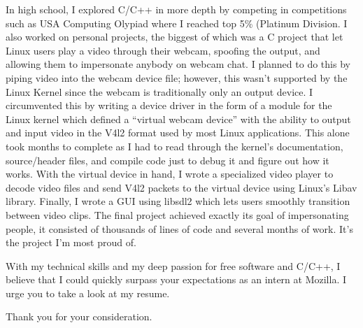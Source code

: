 \documentclass[11pt, letterpaper]{awesome-cv}
\begin{document}
\begin{cvletter}
In high school, I explored C/C++ in more depth by competing in competitions such as USA Computing Olypiad where I reached top 5\% (Platinum Division. I also worked on personal projects, the biggest of which was a C project that let Linux users play a video through their webcam, spoofing the output, and allowing them to impersonate anybody on webcam chat. I planned to do this by piping video into the webcam device file; however, this wasn’t supported by the Linux Kernel since the webcam is traditionally only an output device. I circumvented this by writing a device driver in the form of a module for the Linux kernel which defined a “virtual webcam device” with the ability to output and input video in the V4l2 format used by most Linux applications. This alone took months to complete as I had to read through the kernel’s documentation, source/header files, and compile code just to debug it and figure out how it works. With the virtual device in hand, I wrote a specialized video player to decode video files and send V4l2 packets to the virtual device using Linux’s Libav library. Finally, I wrote a GUI using libsdl2 which lets users smoothly transition between video clips. The final project achieved exactly its goal of impersonating people, it consisted of thousands of lines of code and several months of work. It’s the project I’m most proud of.

With my technical skills and my deep passion for free software and C/C++, I believe that I could quickly surpass your expectations as an intern at Mozilla. I urge you to take a look at my resume.

Thank you for your consideration.
\end{cvletter}


\makeletterclosing
\end{document}
